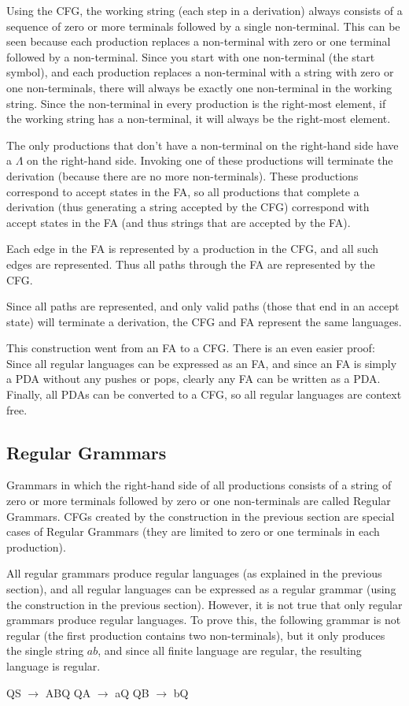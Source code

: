 \documentclass[letterpaper,12pt,openany,reqno]{book}%
\newcommand{\cfgprod}[2] {{\ttfamily #1} $\rightarrow$ {\ttfamily #2}}
\begin{document}
Using the CFG, the working string (each step in a derivation) always consists of a sequence of zero or more terminals followed by a single non-terminal. This can be seen because each production replaces a non-terminal with zero or one terminal followed by a non-terminal. Since you start with one non-terminal (the start symbol), and each production replaces a non-terminal with a string with zero or one non-terminals, there will always be exactly one non-terminal in the working string. Since the non-terminal in every production is the right-most element, if the working string has a non-terminal, it will always be the right-most element.

The only productions that don't have a non-terminal on the right-hand side have a $\Lambda$ on the right-hand side. Invoking one of these productions will terminate the derivation (because there are no more non-terminals). These productions correspond to accept states in the FA, so all productions that complete a derivation (thus generating a string accepted by the CFG) correspond with accept states in the FA (and thus strings that are accepted by the FA).

Each edge in the FA is represented by a production in the CFG, and all such edges are represented. Thus all paths through the FA are represented by the CFG.

Since all paths are represented, and only valid paths (those that end in an accept state) will terminate a derivation, the CFG and FA represent the same languages.

This construction went from an FA to a CFG. There is an even easier proof: Since all regular languages can be expressed as an FA, and since an FA is simply a PDA without any pushes or pops, clearly any FA can be written as a PDA. Finally, all PDAs can be converted to a CFG, so all regular languages are context free.

\subsection{Regular Grammars}
Grammars in which the right-hand side of all productions consists of a string of zero or more terminals followed by zero or one non-terminals are called Regular Grammars. CFGs created by the construction in the previous section are special cases of Regular Grammars (they are limited to zero or one terminals in each production).

All regular grammars produce regular languages (as explained in the previous section), and all regular languages can be expressed as a regular grammar (using the construction in the previous section). However, it is not true that only regular grammars produce regular languages. To prove this, the following grammar is not regular (the first production contains two non-terminals), but it only produces the single string $ab$, and since all finite language are regular, the resulting language is regular.
\begin{cfg}{}{}
Q\cfgprod{S}{AB}Q
Q\cfgprod{A}{a}Q
Q\cfgprod{B}{b}Q
\end{cfg}
\end{document}
